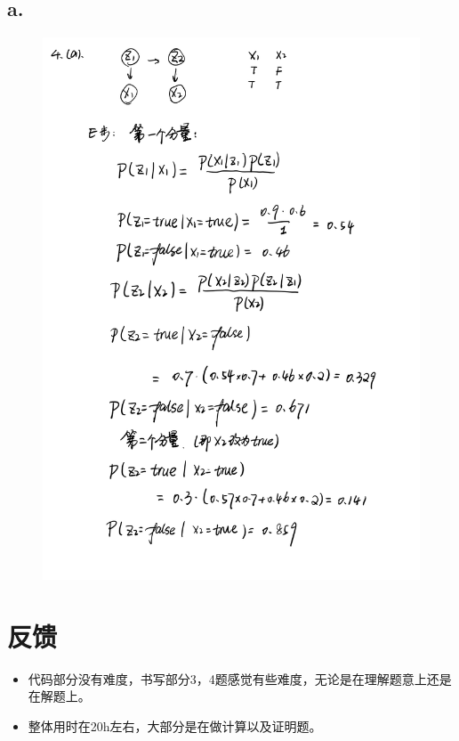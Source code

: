 \documentclass{article}
\begin{document}
\subsection*{a.}
\begin{figure}[H]
    \centering
    \includegraphics[scale=0.5]{4a.png}
\end{figure}
\section*{反馈}

\begin{itemize}
    \item 代码部分没有难度，书写部分3，4题感觉有些难度，无论是在理解题意上还是在解题上。
    \item 整体用时在20h左右，大部分是在做计算以及证明题。
\end{itemize}
\end{document}
